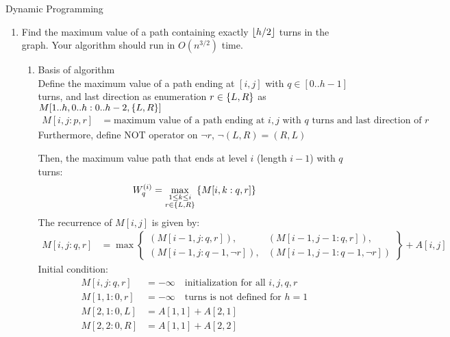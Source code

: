 \documentclass{article}
\numberwithin{table}{section}
\numberwithin{figure}{section}
\begin{document}
\begin{section}{Dynamic Programming}
\begin{enumerate}
    \newpage 
    \item Find the maximum value of a path containing exactly $\lfloor h/2\rfloor$ turns in the graph. Your algorithm should run in $O(n^{3/2})$ time.
    \begin{tcolorbox}[breakable]
        \begin{enumerate}
            \item Basis of algorithm \\
            Define the maximum value of a path ending at $[i,j]$ with $q \in [0..h-1]$ turns, and last direction as enumeration $r \in \left\{L, R\right\}$  as $M[1..h, 0..h : 0..h-2, \left\{L,R\right\}]$
            \begin{align*}
                M[i,j : p, r] &= \text{maximum value of a path ending at $i,j$ with $q$ turns and last direction of $r$}
            \end{align*}
            Furthermore, define NOT operator on $\neg r$, $\neg (L, R) = (R, L)$
            
            Then, the maximum value path that ends at level $i$ (length $i-1$) with $q$ turns:
            \begin{align*}
                W_q^{\left(i\right)} = \max_{\substack{1 \leq k \leq i \\ r \in \left\{L,R\right\}}}\left\{M[i, k : q, r]\right\}
            \end{align*}
            The recurrence of $M[i, j]$ is given by:
            \begin{align*}
                M[i, j : q, r] &= \max\left\{
                \begin{matrix}
                    (M[i-1, j : q, r]), & (M[i-1, j-1 : q, r]),  \\ 
                    (M[i-1, j : q-1, \neg r]), & (M[i-1, j-1 : q-1, \neg r]) 
                \end{matrix}
                \right\} + A[i, j]
            \end{align*}
            Initial condition:
            \begin{align*}
                M[i, j : q, r] &= -\infty \quad \text{initialization for all $i, j, q, r$}\\
                M[1, 1 : 0, r] &= -\infty \quad \text{turns is not defined for $h=1$}\\
                M[2, 1 : 0, L] &= A[1,1] + A[2, 1] \\
                M[2, 2 : 0, R] &= A[1,1] + A[2, 2]
            \end{align*}
            

\end{enumerate}
\end{tcolorbox}
\end{enumerate}
\end{section}
\end{document}
